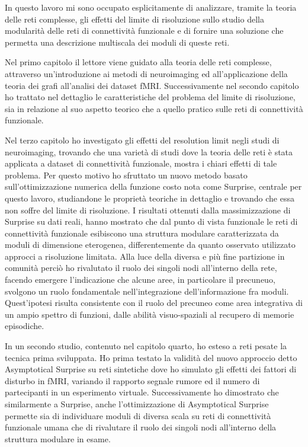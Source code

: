 In questo lavoro mi sono occupato esplicitamente di analizzare, tramite la teoria delle reti complesse, gli effetti del limite di risoluzione sullo studio della modularità delle reti di connettività funzionale e di fornire una soluzione che permetta una descrizione multiscala dei moduli di queste reti.

Nel primo capitolo il lettore viene guidato alla teoria delle reti complesse, attraverso un'introduzione ai metodi di neuroimaging ed all'applicazione della teoria dei grafi all'analisi dei dataset fMRI.
Successivamente nel secondo capitolo ho trattato nel dettaglio le caratteristiche del problema del limite di risoluzione, sia in relazione al suo aspetto teorico che a quello pratico sulle reti di connettività funzionale.

Nel terzo capitolo ho investigato gli effetti del resolution limit negli studi di neuroimaging, trovando che una varietà di studi dove la teoria delle reti è stata applicata a dataset di connettività funzionale, mostra i chiari effetti di tale problema.
Per questo motivo ho sfruttato un nuovo metodo basato sull'ottimizzazione numerica della funzione costo nota come Surprise, centrale per questo lavoro, studiandone le proprietà teoriche in dettaglio e trovando che essa non soffre del limite di risoluzione.
I risultati ottenuti dalla massimizzazione di Surprise su dati reali, hanno mostrato che dal punto di vista funzionale le reti di connettività funzionale esibiscono una struttura modulare caratterizzata da moduli di dimensione eterogenea, differentemente da quanto osservato utilizzato approcci a risoluzione limitata.
Alla luce della diversa e più fine partizione in comunità perciò ho rivalutato il ruolo dei singoli nodi all'interno della rete, facendo emergere l'indicazione che alcune aree, in particolare il precuneuo, svolgono un ruolo fondamentale nell'integrazione dell'informazione fra moduli. Quest'ipotesi risulta consistente con il ruolo del precuneo come area integrativa di un ampio spettro di funzioni, dalle abilità visuo-spaziali al recupero di memorie episodiche.

In un secondo studio, contenuto nel capitolo quarto, ho esteso a reti pesate la tecnica prima sviluppata.
Ho prima testato la validità del nuovo approccio detto Asymptotical Surprise su reti sintetiche dove ho simulato gli effetti dei fattori di disturbo in fMRI, variando il rapporto segnale rumore ed il numero di partecipanti in un esperimento virtuale.
Successivamente ho dimostrato che similarmente a Surprise, anche l'ottimizzazione di Asymptotical Surprise permette sia di individuare moduli di diversa scala su reti di connettività funzionale umana che di rivalutare il ruolo dei singoli nodi all'interno della struttura modulare in esame.

